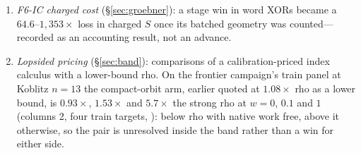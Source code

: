 \begin{enumerate}
\item \emph{F6-IC charged cost} (\S\ref{sec:groebner}): a stage win in
  word XORs became a $64.6$--$1{,}353\times$ loss in charged $S$ once its
  batched geometry was counted---recorded as an accounting result, not an
  advance.
\item \emph{Lopsided pricing} (\S\ref{sec:band}): comparisons of a
  calibration-priced index calculus with a lower-bound rho. On the
  frontier campaign's train panel at Koblitz $n=13$ the compact-orbit arm,
  earlier quoted at $1.08\times$ rho as a lower bound, is $0.93\times$,
  $1.53\times$ and $5.7\times$ the strong rho at $w=0$, $0.1$ and $1$
  (columns 2, four train targets,
  ): below
  rho with native work free, above it otherwise, so the pair is unresolved
  inside the band rather than a win for either side.
\end{enumerate}
